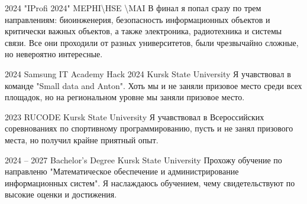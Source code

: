 \documentclass[9pt]{developercv} %
\begin{document}


\begin{entrylist}

	\entry
  {2024}
    {"IProfi 2024"}
		{MEPHI\textbackslash \space HSE \textbackslash \space MAI }
		{
В финал я попал сразу по трем направлениям: 
биоинженерия, безопасность информационных объектов
и критически важных объектов, а также электроника, радиотехника 
и системы связи. Все они проходили от разных 
университетов, были чрезвычайно сложные, но невероятно интересные.
    }
\end{entrylist}

\begin{entrylist}

	\entry
  {2024}
    {Samsung IT Academy Hack 2024}
		{Kursk State University}
		{
      Я учавствовал в команде "Small data and Anton".
      Хоть мы и не заняли призовое место среди всех площадок, но 
      на региональном уровне мы заняли призовое место.
    }
\end{entrylist}

\begin{entrylist}

	\entry
  {2023}
    {RUCODE}
		{Kursk State University}
		{
      Я учавствовал в Всероссийских соревнованиях по спортивному программированию,
      пусть и не занял призового места, но получил крайне приятный опыт.
    }
\end{entrylist}





\begin{entrylist}

	\entry
		{2024 -- 2027}
		{Bachelor's Degree}
		{Kursk State University}
    {
      Прохожу обучение по направленю "Математическое обеспечение и администрирование информационных систем". 
      Я наслаждаюсь обучением, чему свидетельствуют по высокие оценки и достижения.
    }
\end{entrylist}
\end{document}
